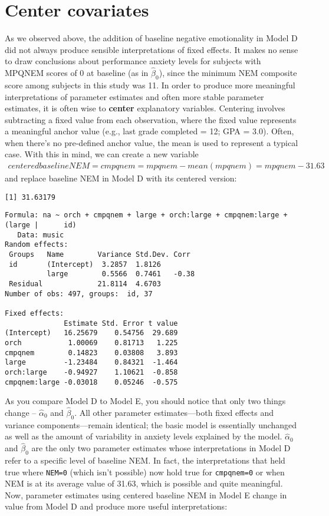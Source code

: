 \documentclass[
]{krantz}
\begin{document}
\hypertarget{sec:modele}{%
\section{Center covariates}\label{sec:modele}}

As we observed above, the addition of baseline negative emotionality in Model D did not always produce sensible interpretations of fixed effects. It makes no sense to draw conclusions about performance anxiety levels for subjects with MPQNEM scores of 0 at baseline (as in \(\hat{\beta}_{0}\)), since the minimum NEM composite score among subjects in this study was 11. In order to produce more meaningful interpretations of parameter estimates and often more stable parameter estimates, it is often wise to \textbf{center} explanatory variables. Centering involves subtracting a fixed value from each observation, where the fixed value represents a meaningful anchor value (e.g., last grade completed = 12; GPA = 3.0). Often, when there's no pre-defined anchor value, the mean is used to represent a typical case. With this in mind, we can create a new variable
\begin{eqnarray*}
\textstyle{centeredbaselineNEM} = \textstyle{cmpqnem} = \textstyle{mpqnem - mean(mpqnem)} = \textstyle{mpqnem} - 31.63
\end{eqnarray*}
and replace baseline NEM in Model D with its centered version:

\begin{verbatim}
[1] 31.63179
\end{verbatim}

\begin{verbatim}
Formula: na ~ orch + cmpqnem + large + orch:large + cmpqnem:large + (large |      id)
   Data: music
Random effects:
 Groups   Name        Variance Std.Dev. Corr 
 id       (Intercept)  3.2857  1.8126        
          large        0.5566  0.7461   -0.38
 Residual             21.8114  4.6703        
Number of obs: 497, groups:  id, 37

Fixed effects:
              Estimate Std. Error t value
(Intercept)   16.25679    0.54756  29.689
orch           1.00069    0.81713   1.225
cmpqnem        0.14823    0.03808   3.893
large         -1.23484    0.84321  -1.464
orch:large    -0.94927    1.10621  -0.858
cmpqnem:large -0.03018    0.05246  -0.575
\end{verbatim}

As you compare Model D to Model E, you should notice that only two things change -- \(\hat{\alpha}_{0}\) and \(\hat{\beta}_{0}\). All other parameter estimates---both fixed effects and variance components---remain identical; the basic model is essentially unchanged as well as the amount of variability in anxiety levels explained by the model. \(\hat{\alpha}_{0}\) and \(\hat{\beta}_{0}\) are the only two parameter estimates whose interpretations in Model D refer to a specific level of baseline NEM. In fact, the interpretations that held true where \texttt{NEM=0} (which isn't possible) now hold true for \texttt{cmpqnem=0} or when NEM is at its average value of 31.63, which is possible and quite meaningful. Now, parameter estimates using centered baseline NEM in Model E change in value from Model D and produce more useful interpretations:
\end{document}
